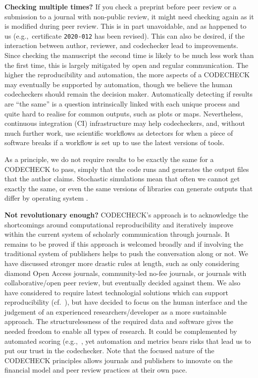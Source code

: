 \documentclass[12pt]{article}
\begin{document}
\textbf{Checking multiple times?} If you check a preprint before peer
review or a submission to a journal with non-public review, it might
need checking again as it is modified during peer review.  This is in
part unavoidable, and as happened to us (e.g.,~certificate \texttt{2020-012}
\cite{cert-2020-012} has been revised). This can also be desired, if
the interaction between author, reviewer, and codechecker lead to
improvements.  Since checking the manuscript the second time is likely
to be much less work than the first time, this is largely mitigated by
open and regular communication.  The higher the reproducibility and
automation, the more aspects of a CODECHECK may eventually be
supported by automation, though we believe the human codecheckers
should remain the decision maker.  Automatically detecting if results
are ``the same'' is a question intrinsically linked with each unique
process and quite hard to realise for common outputs, such as plots or
maps.  Nevertheless, continuous integration (CI) infrastructure may
help codecheckers, and, without much further work, use scientific
workflows as detectors for when a piece of software breaks if a
workflow is set up to use the latest versions of tools.

As a principle, we do not require results to be exactly the same for a
CODECHECK to pass, simply that the code runs and generates the output
files that the author claims. Stochastic simulations mean that often
we cannot get exactly the same, or even the same versions of libraries
can generate outputs that differ by operating system
\cite{Gronenschild2012-pp}.

\textbf{Not revolutionary enough?}
CODECHECK's approach is to acknowledge the shortcomings around 
computational reproducibility and iteratively improve within the current
system of scholarly communication through journals.
It remains to be proved if this approach is welcomed broadly and if 
involving the traditional system of publishers helps to push the 
conversation along or not.
We have discussed stronger more drastic rules at length, such as only 
considering diamond Open Access journals, community-led no-fee journals,
or journals with collaborative/open peer review, but eventually decided
against them.
We also have considered to require latest technologial solutions which can
support reproducibility (cf.~\cite{konkol_publishing_2020}), but have 
decided to focus on the human interface and the judgement of an experienced
researchers/developer as a more sustainable approach.
The structurelessness of the required data and software gives the needed
freedom to enable all types of research. It could be complemented by
automated scoring (e.g.,~\cite{menke_rigor_2020}, yet automation and 
metrics bears risks that lead us to put our trust in the codechecker.
Note that the focused nature of the CODECHECK principles allows journals
and publishers to innovate on the financial model and peer review practices
at their own pace.
\end{document}
